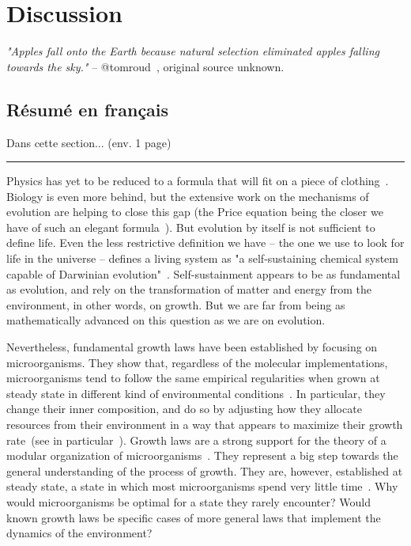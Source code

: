 \chapter{Discussion}
\label{chap:discussion}

\textit{"Apples fall onto the Earth because natural selection eliminated apples falling towards the sky."} -- @tomroud~\cite{tomroud_tom_2016}, original source unknown.

\section*{Résumé en français}

Dans cette section... (env. 1 page)

\begin{center}
\noindent\rule{4cm}{0.1pt}
\end{center}

Physics has yet to be reduced to a formula that will fit on a piece of clothing~\cite{falk_universe_2005}.
Biology is even more behind, but the extensive work on the mechanisms of evolution are helping to close this gap (the Price equation being the closer we have of such an elegant formula~\cite{frank_natural_2012}).
But evolution by itself is not sufficient to define life.
Even the less restrictive definition we have -- the one we use to look for life in the universe -- defines a living system as "a self-sustaining chemical system capable of Darwinian evolution"~\cite{deamer_origins_1994,benner_defining_2010}.
Self-sustainment appears to be as fundamental as evolution, and rely on the transformation of matter and energy from the environment, in other words, on growth.
But we are far from being as mathematically advanced on this question as we are on evolution.

Nevertheless, fundamental growth laws have been established by focusing on microorganisms.
They show that, regardless of the molecular implementations, microorganisms tend to follow the same empirical regularities when grown at steady state in different kind of environmental conditions~\cite{molenaar_shifts_2009,scott_emergence_2014,scott_interdependence_2010,scott_bacterial_2011}.
In particular, they change their inner composition, and do so by adjusting how they allocate resources from their environment in a way that appears to maximize their growth rate~(see in particular~\cite{molenaar_shifts_2009,scott_emergence_2014}).
Growth laws are a strong support for the theory of a modular organization of microorganisms~\cite{scott_emergence_2014,hartwell_molecular_1999,arkin_fast_2006,guido_bottom-up_2006}.
They represent a big step towards the general understanding of the process of growth.
They are, however, established at steady state, a state in which most microorganisms spend very little time~\cite{mcarthur_microbial_2006,menge_nitrogen_2012,
hobbie_microbes_2013,savageau_escherichia_1983,
savageau_demand_1998,blount_unexhausted_2015,vanelsas_survival_2011}.
Why would microorganisms be optimal for a state they rarely encounter?
Would known growth laws be specific cases of more general laws that implement the dynamics of the environment?


